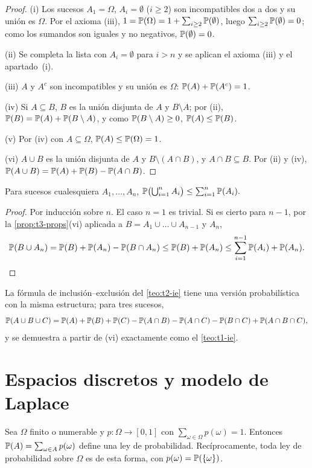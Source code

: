 \begin{proof}
(i) Los sucesos $A_1=\Omega$, $A_i=\emptyset$ ($i\ge2$) son incompatibles dos a dos y su unión es $\Omega$. Por el axioma (iii), $1=\mathbb{P}(\Omega)=1+\sum_{i\ge2}\mathbb{P}(\emptyset)$, luego $\sum_{i\ge2}\mathbb{P}(\emptyset)=0$; como los sumandos son iguales y no negativos, $\mathbb{P}(\emptyset)=0$.

(ii) Se completa la lista con $A_i=\emptyset$ para $i>n$ y se aplican el axioma (iii) y el apartado~(i).

(iii) $A$ y $A^{c}$ son incompatibles y su unión es $\Omega$: $\mathbb{P}(A)+\mathbb{P}(A^{c})=1$.

(iv) Si $A\subseteq B$, $B$ es la unión disjunta de $A$ y $B\setminus A$; por (ii), $\mathbb{P}(B)=\mathbb{P}(A)+\mathbb{P}(B\setminus A)$, y como $\mathbb{P}(B\setminus A)\ge0$, $\mathbb{P}(A)\le\mathbb{P}(B)$.

(v) Por (iv) con $A\subseteq\Omega$, $\mathbb{P}(A)\le\mathbb{P}(\Omega)=1$.

(vi) $A\cup B$ es la unión disjunta de $A$ y $B\setminus(A\cap B)$, y $A\cap B\subseteq B$. Por (ii) y (iv), $\mathbb{P}(A\cup B)=\mathbb{P}(A)+\mathbb{P}(B)-\mathbb{P}(A\cap B)$.
\end{proof}

\begin{teorema}\label{teo:t3-boole}
Para sucesos cualesquiera $A_1,\dots,A_n$,
\(
\mathbb{P}\bigl(\bigcup_{i=1}^{n}A_i\bigr)\le\sum_{i=1}^{n}\mathbb{P}(A_i).
\)
\end{teorema}

\begin{proof}
Por inducción sobre $n$. El caso $n=1$ es trivial. Si es cierto para $n-1$, por la \cref{prop:t3-props}(vi) aplicada a $B=A_1\cup\dots\cup A_{n-1}$ y $A_n$,
\[
\mathbb{P}(B\cup A_n)=\mathbb{P}(B)+\mathbb{P}(A_n)-\mathbb{P}(B\cap A_n)\le\mathbb{P}(B)+\mathbb{P}(A_n)\le\sum_{i=1}^{n-1}\mathbb{P}(A_i)+\mathbb{P}(A_n).\qedhere
\]
\end{proof}

La fórmula de inclusión--exclusión del \cref{teo:t2-ie} tiene una versión probabilística con la misma estructura; para tres sucesos,
\[
\mathbb{P}(A\cup B\cup C)=\mathbb{P}(A)+\mathbb{P}(B)+\mathbb{P}(C)-\mathbb{P}(A\cap B)-\mathbb{P}(A\cap C)-\mathbb{P}(B\cap C)+\mathbb{P}(A\cap B\cap C),
\]
y se demuestra a partir de (vi) exactamente como el \cref{teo:t1-ie}.

\section{Espacios discretos y modelo de Laplace}

\begin{proposicion}\label{prop:t3-discreto}
Sea $\Omega$ finito o numerable y $p\colon\Omega\to[0,1]$ con $\sum_{\omega\in\Omega}p(\omega)=1$. Entonces $\mathbb{P}(A)=\sum_{\omega\in A}p(\omega)$ define una ley de probabilidad. Recíprocamente, toda ley de probabilidad sobre $\Omega$ es de esta forma, con $p(\omega)=\mathbb{P}(\{\omega\})$.
\end{proposicion}

